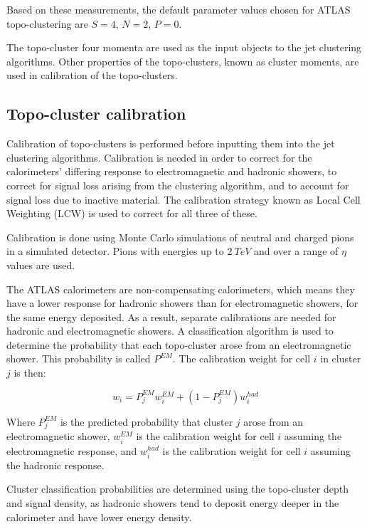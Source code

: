 Based on these measurements, the default parameter values chosen for ATLAS topo-clustering are $S=4$, $N=2$, $P=0$.

The topo-cluster four momenta are used as the input objects to the jet clustering algorithms.
Other properties of the topo-clusters, known as cluster moments, are used in calibration of the topo-clusters.

\subsection{Topo-cluster calibration}\label{subsec:topo_calibration}

Calibration of topo-clusters is performed before inputting them into the jet clustering algorithms.
Calibration is needed in order to correct for the calorimeters' differing response to electromagnetic and hadronic
showers, to correct for signal loss arising from the clustering algorithm, and to account for signal loss due to
inactive material.
The calibration strategy known as Local Cell Weighting (LCW) is used to correct for all three of these.

Calibration is done using Monte Carlo simulations of neutral and charged pions in a simulated detector.
Pions with energies up to $2~TeV$ and over a range of $\eta$ values are used.

The ATLAS calorimeters are non-compensating calorimeters, which means they have a lower response for hadronic showers
than for electromagnetic showers, for the same energy deposited.
As a result, separate calibrations are needed for hadronic and electromagnetic showers.
A classification algorithm is used to determine the probability that each topo-cluster arose from an electromagnetic
shower.
This probability is called $P^{EM}$.
The calibration weight for cell $i$ in cluster $j$ is then:

\begin{equation}\label{eq:lcw_weights}
    w_i = P_{j}^{EM}w_i^{EM}+\left(1-P^{EM}_j\right)w_i^{had}
\end{equation}

Where $P_j^{EM}$ is the predicted probability that cluster $j$ arose from an electromagnetic shower,
$w_{i}^{EM}$ is the calibration weight for cell $i$ assuming the electromagnetic response, and
$w_{i}^{had}$ is the calibration weight for cell $i$ assuming the hadronic response.\cite{jet-topo-cluster}

Cluster classification probabilities are determined using the topo-cluster depth and signal density, as hadronic
showers tend to deposit energy deeper in the calorimeter and have lower energy density.\cite{jet-topo-cluster}

